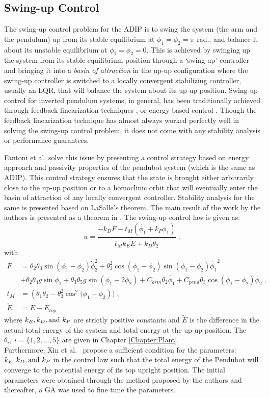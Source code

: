 \subsection{Swing-up Control}
\label{sec: swingup}
The swing-up control problem for the ADIP is to swing the system (the arm and the pendulum) up from its stable equilibrium at $\phi_1 = \phi_2 = \pi$ rad., and balance it about its unstable equilibrium at $\phi_1 = \phi_2 = 0$. This is achieved by swinging up the system from its stable equilibrium position through a `swing-up' controller and bringing it into a \textit{basin of attraction} in the up-up configuration where the swing-up controller is switched to a locally convergent stabilizing controller, usually an LQR, that will balance the system about its up-up position. Swing-up control for inverted pendulum systems, in general, has been traditionally achieved through feedback linearization techniques \cite{Spong}, or energy-based control \cite{Cazzolato}. Though the feedback linearization technique has almost always worked perfectly well in solving the swing-up control problem, it does not come with any stability analysis or performance guarantees.\par
Fantoni et al. \cite{Fantoni} solve this issue by presenting a control strategy based on energy approach and passivity properties of the pendubot system (which is the same as ADIP). This control strategy ensures that the state is brought either arbitrarily close to the up-up position or to a homoclinic orbit that will eventually enter the basin of attraction of any locally convergent controller. Stability analysis for the same is presented based on LaSalle's theorem. The main result of the work by the authors is presented as a theorem in \cite{Fantoni}. The swing-up control law is given as:
\begin{equation}
    u = \frac{-k_DF-t_M(\dot{\phi_1}+k_P{\phi_1})}{t_Mk_E\tilde{E} + k_D\theta_2} \;,
\end{equation}
with 
\begin{align*}
F &= \theta_2\theta_3\sin{(\phi_1-\phi_2)}\dot{\phi}_2^2 + \theta_3^2\cos{(\phi_1 - \phi_2)}\sin{(\phi_1 - \phi_2)}\dot{\phi_1}^2\\
&+ \theta_2\theta_4g\sin{\phi_1} + \theta_3\theta_5g\sin{(\phi_1 - 2\phi_2)} + C_{arm}\theta_2\dot{\phi_1} + C_{pend}\theta_3\cos{(\phi_1-\phi_2)}\dot{\phi_2}\;, \\
t_M &= (\theta_1\theta_2 - \theta_3^2\cos^2{(\phi_1-\phi_2})) \;,\\
\tilde{E} &= E - E_{top}
\end{align*}
where $k_E,k_D, \textup{and}~ k_P$ are strictly positive constants and $\tilde{E}$ is the difference in the actual total energy of the system and total energy at the up-up position. The $\theta_i,~i = \{1,2,\dots,5\}$ are given in Chapter \ref{Chapter:Plant}.\\
Furthermore, Xin et al.~\cite{XIN} propose a sufficient condition for the parameters: $k_E,k_D, \textup{and}~ k_P$ in the control law such that the total energy of the Pendubot will converge to the potential energy of its top upright position. The initial parameters were obtained through the method proposed by the authors and thereafter, a GA was used to fine tune the parameters.\pagebreak

